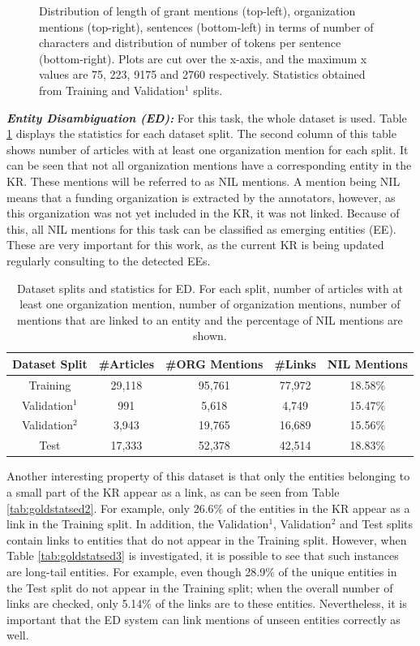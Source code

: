 \documentclass{report}
\theoremstyle{definition}
\theoremstyle{remark}
\begin{document}
\begin{figure}[h!]
    \caption{Distribution of length of grant mentions (top-left), organization mentions (top-right), sentences (bottom-left) in terms of number of characters and distribution of number of tokens per sentence (bottom-right). Plots are cut over the x-axis, and the maximum x values are 75, 223, 9175 and 2760 respectively. Statistics obtained from Training and Validation$^1$ splits.}
    \label{fig:nerdatalen}
\end{figure}

\noindent \textit{\textbf{Entity Disambiguation (ED):}} For this task, the whole dataset is used. Table \ref{tab:goldstatsed} displays the statistics for each dataset split. The second column of this table shows number of articles with at least one organization mention for each split. It can be seen that not all organization mentions have a corresponding entity in the KR. These mentions will be referred to as NIL mentions. A mention being NIL means that a funding organization is extracted by the annotators, however, as this organization was not yet included in the KR, it was not linked. Because of this, all NIL mentions for this task can be classified as emerging entities (EE). These are very important for this work, as the current KR is being updated regularly consulting to the detected EEs.

\begin{table}[h!]
    \centering
    \begin{tabular}{ccccc}
    Dataset Split & \#Articles & \#ORG Mentions & \#Links & NIL Mentions  \\
    \hline
    Training & 29,118 & 95,761 & 77,972 & 18.58\% \\
    Validation$^1$ & 991 & 5,618 & 4,749 & 15.47\% \\
    Validation$^2$ & 3,943 & 19,765 & 16,689 & 15.56\% \\
    Test & 17,333 & 52,378 & 42,514 & 18.83\% \\ 
    \end{tabular}
    \caption{Dataset splits and statistics for ED. For each split, number of articles with at least one organization mention, number of organization mentions, number of mentions that are linked to an entity and the percentage of NIL mentions are shown.}
    \label{tab:goldstatsed}
\end{table}

Another interesting property of this dataset is that only the entities belonging to a small part of the KR appear as a link, as can be seen from Table \ref{tab:goldstatsed2}. For example, only 26.6\% of the entities in the KR appear as a link in the Training split. In addition, the  Validation$^1$, Validation$^2$ and Test splits contain links to entities that do not appear in the Training split. However, when  Table \ref{tab:goldstatsed3} is investigated, it is possible to see that such instances are long-tail entities. For example, even though 28.9\% of the unique entities in the Test split do not appear in the Training split; when the overall number of links are checked, only 5.14\% of the links are to these entities. Nevertheless, it is important that the ED system can link mentions of unseen entities correctly as well.
\end{document}
